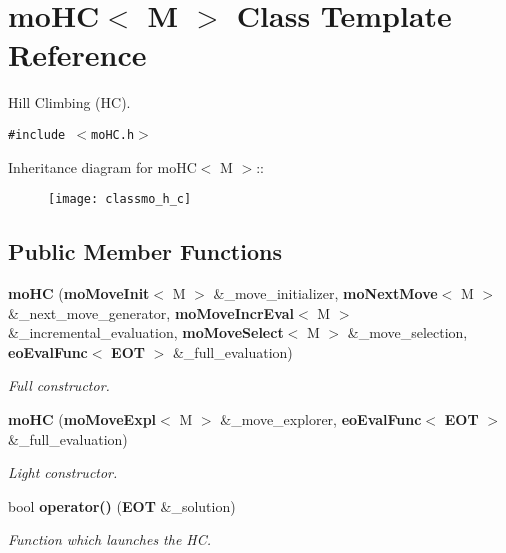 \section{mo\-HC$<$ M $>$ Class Template Reference}
\label{classmo_h_c}
Hill Climbing (HC).  


{\tt \#include $<$mo\-HC.h$>$}

Inheritance diagram for mo\-HC$<$ M $>$::\begin{figure}[H]
\begin{center}
\leavevmode
\texttt{[image: classmo\_h\_c]}
\end{center}
\end{figure}
\subsection*{Public Member Functions}
\begin{CompactItemize}
\item 
{\bf mo\-HC} ({\bf mo\-Move\-Init}$<$ M $>$ \&\_\-move\_\-initializer, {\bf mo\-Next\-Move}$<$ M $>$ \&\_\-next\_\-move\_\-generator, {\bf mo\-Move\-Incr\-Eval}$<$ M $>$ \&\_\-incremental\_\-evaluation, {\bf mo\-Move\-Select}$<$ M $>$ \&\_\-move\_\-selection, {\bf eo\-Eval\-Func}$<$ {\bf EOT} $>$ \&\_\-full\_\-evaluation)
\begin{CompactList}\small\item\em Full constructor. \item\end{CompactList}\item 
{\bf mo\-HC} ({\bf mo\-Move\-Expl}$<$ M $>$ \&\_\-move\_\-explorer, {\bf eo\-Eval\-Func}$<$ {\bf EOT} $>$ \&\_\-full\_\-evaluation)
\begin{CompactList}\small\item\em Light constructor. \item\end{CompactList}\item 
bool {\bf operator()} ({\bf EOT} \&\_\-solution)
\begin{CompactList}\small\item\em Function which launches the HC. \item\end{CompactList}\end{CompactItemize}
